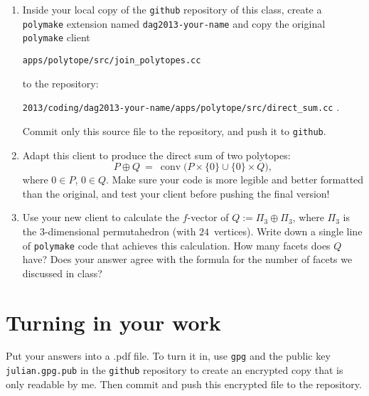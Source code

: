 \documentclass[11pt]{amsart}
\DeclareMathOperator{\conv}{conv}
\begin{document}
 \begin{enumerate}
 \setlength{\itemsep}{2ex}
 \item Inside your local copy of the \texttt{github} repository of this class, create a \texttt{polymake} extension named \texttt{dag2013-your-name} and copy the original \texttt{polymake} client 

\texttt{apps/polytope/src/join\_polytopes.cc} 

\noindent to the repository:

\texttt{2013/coding/dag2013-your-name/apps/polytope/src/direct\_sum.cc} . 

\noindent Commit only this source file to the repository, and push it to \texttt{github}.

\item Adapt this client to produce the direct sum of two polytopes:
\[
   P\oplus Q
   \ = \
   \conv\big(P\times\{0\}\cup\{0\}\times Q\big),
\]
where $0\in P$, $0\in Q$. Make sure your code is more legible and better formatted than the original, and test your client before pushing the final version! 

\item Use your new client to calculate the $f$-vector of $Q:=\Pi_3\oplus \Pi_3$, where $\Pi_3$ is the $3$-dimensional permutahedron (with $24$~vertices). Write down a single line of \texttt{polymake} code that achieves this calculation. How many facets does $Q$ have? Does your answer agree with the formula for the number of facets we discussed in class?
 \end{enumerate}


\bigskip
\section*{Turning in your work}

Put your answers into a .pdf file. To turn it in, use \texttt{gpg} and the public key \texttt{julian.gpg.pub} in the \texttt{github} repository to create an encrypted copy that is only readable by me. Then commit and push this encrypted file to the repository.
\end{document}
